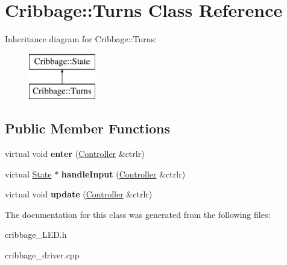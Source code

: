 \hypertarget{class_cribbage_1_1_turns}{}\section{Cribbage\+:\+:Turns Class Reference}
\label{class_cribbage_1_1_turns}
Inheritance diagram for Cribbage\+:\+:Turns\+:\begin{figure}[H]
\begin{center}
\leavevmode
\includegraphics[height=2.000000cm]{class_cribbage_1_1_turns}
\end{center}
\end{figure}
\subsection*{Public Member Functions}
\begin{DoxyCompactItemize}
\item 
\mbox{\label{class_cribbage_1_1_turns_a2934f7734d3763832cf177dc42ad7f28}} 
virtual void {\bfseries enter} (\hyperlink{class_cribbage_1_1_controller}{Controller} \&ctrlr)
\item 
\mbox{\label{class_cribbage_1_1_turns_a4a7f7849e80bda4c08736462be1c710c}} 
virtual \hyperlink{class_cribbage_1_1_state}{State} $\ast$ {\bfseries handle\+Input} (\hyperlink{class_cribbage_1_1_controller}{Controller} \&ctrlr)
\item 
\mbox{\label{class_cribbage_1_1_turns_afba9784632241e344cc4959b31f3742f}} 
virtual void {\bfseries update} (\hyperlink{class_cribbage_1_1_controller}{Controller} \&ctrlr)
\end{DoxyCompactItemize}


The documentation for this class was generated from the following files\+:\begin{DoxyCompactItemize}
\item 
cribbage\+\_\+\+L\+E\+D.\+h\item 
cribbage\+\_\+driver.\+cpp\end{DoxyCompactItemize}
